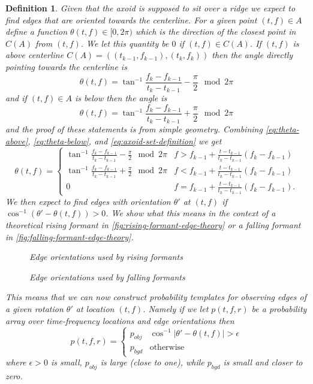 \documentclass[english]{article}
\newtheorem{defn}{Definition}[section]
\begin{document}
\begin{defn}
Given that the axoid is supposed to sit over a ridge we expect
to find edges that are oriented towards the centerline. For a given
point $(t,f)\in A$ define a function $\theta(t,f)\in [0,2\pi)$ which
is the direction of the closest point in $C(A)$ from $(t,f)$.  We
let this quantity be $0$ if $(t,f)\in C(A)$. If
$(t,f)$ is above centerline $C(A)=((t_{k-1},f_{k-1}),(t_k,f_k))$
then the angle directly pointing towards the centerline is
\begin{equation}\label{eq:theta-above}
\theta(t,f) = \tan^{-1}\frac{f_k-f_{k-1}}{t_k-t_{k-1}} -\frac{\pi}{2} \mod 2\pi
\end{equation}
and if $(t,f)\in A$ is below then the angle is 
\begin{equation}\label{eq:theta-below}
\theta(t,f) = \tan^{-1} \frac{f_k-f_{k-1}}{t_k-t_{k-1}} + \frac{\pi}{2} \mod 2\pi
\end{equation}
and the proof of these statements is from simple geometry.  
Combining \autoref{eq:theta-above}, \autoref{eq:theta-below},
and \autoref{eq:axoid-set-definition} we get
\begin{equation}
\theta(t,f) = \begin{cases}
  \tan^{-1} \frac{f_k-f_{k-1}}{t_k-t_{k-1}} -\frac{\pi}{2} \mod 2\pi & f > f_{k-1} + \frac{t-t_{k-1}}{t_k-t_{k-1}}(f_k-f_{k-1})\\
\tan^{-1} \frac{f_k-f_{k-1}}{t_k-t_{k-1}} + \frac{\pi}{2} \mod 2\pi & f < f_{k-1} + \frac{t-t_{k-1}}{t_k-t_{k-1}}(f_k-f_{k-1})\\
0 & f = f_{k-1} + \frac{t-t_{k-1}}{t_k-t_{k-1}}(f_k-f_{k-1}).
\end{cases}
\end{equation}
We then expect to find edges with orientation $\theta'$ at $(t,f)$
if $\cos^{-1}(\theta' - \theta(t,f)) >0$.  We show what this means
in the context of a theoretical rising formant in
\autoref{fig:rising-formant-edge-theory} or a falling formant
in \autoref{fig:falling-formant-edge-theory}.
\begin{figure}
\centering

\caption{Edge orientations used by rising formants}
\label{fig:rising-formant-edge-theory}
\end{figure}
\begin{figure}
\centering

\caption{Edge orientations used by falling formants}
\label{fig:falling-formant-edge-theory}
\end{figure}
This means that we can now construct probability templates
for observing edges of a given rotation $\theta'$ at location
$(t,f)$.  Namely if we let $p(t,f,r)$ be a probability array
over time-frequency locations and edge orientations then
\begin{equation}\label{eq:oriented-probability-array-axoid}
p(t,f,r) = \begin{cases}
p_{obj} & \cos^{-1}|\theta' - \theta(t,f)| >\epsilon\\
p_{bgd} & \text{otherwise}
\end{cases}
\end{equation}
where $\epsilon > 0$ is small, $p_{obj}$ is large (close to one),
while $p_{bgd}$ is small and closer to zero.


\end{defn}
\end{document}
